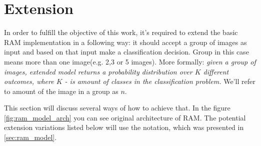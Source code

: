 














%
%
%


\section{Extension}
\label{sec:extension}
In order to fulfill the objective of this work, it's required to extend the basic
RAM implementation in a following way: it should accept a group of images as input
and based on that input make a classification decision. Group in this case means
more than one image(e.g. 2,3 or 5 images). More formally:
\textit{given a group of images, extended model returns a probability distribution over
$K$ different outcomes, where $K$ - is amount of classes in the classification problem.}
We'll refer to amount of the image in a group as $n$.

This section will discuss several ways of how to achieve that.
In the figure \ref{fig:ram_model_arch} you can see original architecture of RAM.
The potential extension variations listed below will use the notation, which
was presented in \autoref{sec:ram_model}.

